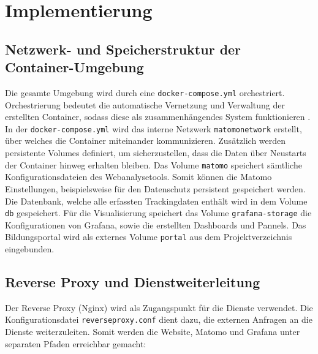 \chapter{Implementierung}
\label{ch:implementierung}

\section{Netzwerk- und Speicherstruktur der Container-Umgebung}
Die gesamte Umgebung wird durch eine \texttt{docker-compose.yml} orchestriert. Orchestrierung bedeutet die automatische Vernetzung und Verwaltung der erstellten Container, sodass diese als zusammenhängendes System funktionieren \parencite{AWS}. In der \texttt{docker-compose.yml} wird das interne Netzwerk \texttt{matomo\textunderscore network} erstellt, über welches die Container miteinander kommunizieren. Zusätzlich werden persistente Volumes definiert, um sicherzustellen, dass die Daten über Neustarts der Container hinweg erhalten bleiben. Das Volume \texttt{matomo} speichert sämtliche Konfigurationsdateien des Webanalysetools. Somit können die Matomo Einstellungen, beispielsweise für den Datenschutz persistent gespeichert werden. Die Datenbank, welche alle erfassten Trackingdaten enthält wird in dem Volume \texttt{db} gespeichert. Für die Visualisierung speichert das Volume \texttt{grafana-storage} die Konfigurationen von Grafana, sowie die erstellten Dashboards und Pannels. Das Bildungsportal wird als externes Volume \texttt{portal} aus dem Projektverzeichnis eingebunden.

\section{Reverse Proxy und Dienstweiterleitung}
Der Reverse Proxy (Nginx) wird als Zugangspunkt für die Dienste verwendet. Die Konfigurationsdatei \texttt{reverse\textunderscore proxy.conf} dient dazu, die externen Anfragen an die Dienste weiterzuleiten. Somit werden die Website, Matomo und Grafana unter separaten Pfaden erreichbar gemacht: 

